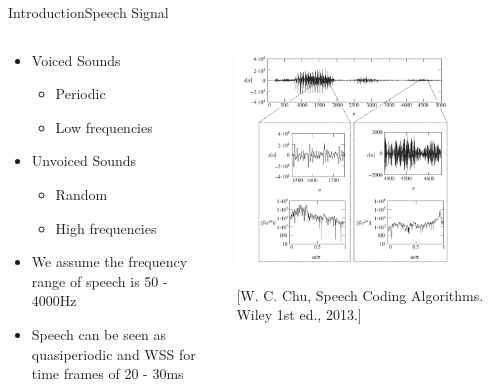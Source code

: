 \begin{frame}{Introduction}{Speech Signal}
	\begin{center}
	\begin{columns}
		\begin{column}{0.5\textwidth}
		\begin{itemize}		
		\item Voiced Sounds
			\begin{itemize}
				\item Periodic 
				\item Low frequencies
			\end{itemize}
		\end{itemize}
		\begin{itemize}
		\item Unvoiced Sounds 
			\begin{itemize}
				\item Random
				\item High frequencies
			\end{itemize}	
		\item We assume the frequency range of speech is 50 - 4000Hz 
		\item Speech can be seen as quasiperiodic and WSS for time frames of 20 - 30ms 	
	    \end{itemize}
	    \end{column}	
	    \begin{column}{0.5\textwidth} 
	    \includegraphics[width=0.8\textwidth]{figures/VoicedvsUnvoiced}
	    
	    [W. C. Chu, Speech Coding Algorithms. Wiley 1st ed., 2013.] 
		\end{column}
	\end{columns}
	\end{center}
\end{frame}

